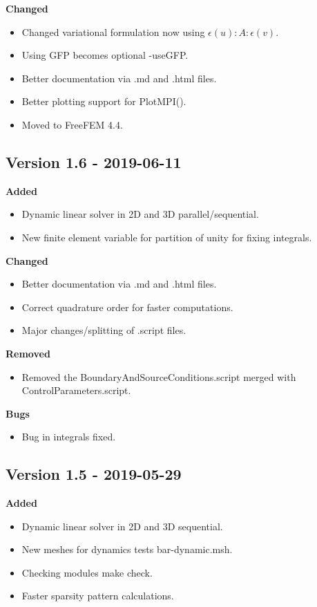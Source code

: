 \documentclass{report}
\begin{document}
\textbf{Changed}
\begin{itemize}
 \item Changed variational formulation now using $\epsilon(u):A:\epsilon(v)$.
 \item Using GFP becomes optional {\ttfamily -useGFP}.
 \item Better documentation via {\ttfamily .md} and {\ttfamily .html} files.
 \item Better plotting support for {\ttfamily PlotMPI()}.
 \item Moved to FreeFEM 4.4.
\end{itemize}


\subsection{Version 1.6 - 2019-06-11}

\textbf{Added}
\begin{itemize}
 \item Dynamic linear solver in 2D and 3D  parallel/sequential.
 \item New finite element variable for partition of unity for fixing integrals.
\end{itemize}


\textbf{Changed}
\begin{itemize}
 \item Better documentation via {\ttfamily.md} and {\ttfamily.html} files.
 \item Correct quadrature order for faster computations.
 \item Major changes/splitting of {\ttfamily.script} files.
\end{itemize}

\textbf{Removed}
\begin{itemize}
 \item Removed the {\ttfamily BoundaryAndSourceConditions.script} merged with {\ttfamily ControlParameters.script}.
\end{itemize}

\textbf{Bugs}
\begin{itemize}
 \item Bug in integrals fixed.
\end{itemize}


\subsection{Version 1.5 - 2019-05-29}

\textbf{Added}
\begin{itemize}
 \item Dynamic linear solver in 2D and 3D  sequential.
 \item New meshes for dynamics tests {\ttfamily bar-dynamic.msh}.
 \item Checking modules {\ttfamily make check}.
 \item Faster sparsity pattern calculations. 
\end{itemize}
\end{document}
